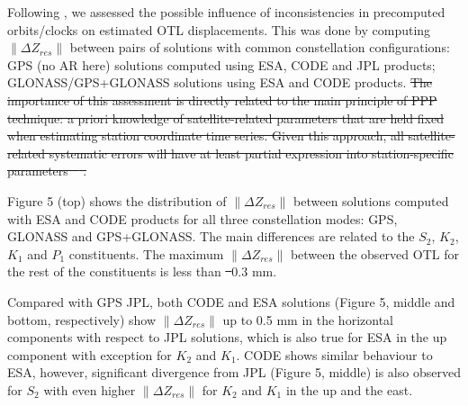 \documentclass[se, manuscript]{copernicus}
\providecommand{\DIFadd}[1]{{\protect\color{blue}\uwave{#1}}} %
\providecommand{\DIFdel}[1]{{\protect\color{red}\sout{#1}}}                      %
\providecommand{\DIFaddbegin}{} %
\providecommand{\DIFaddend}{} %
\providecommand{\DIFdelbegin}{} %
\providecommand{\DIFdelend}{} %
\begin{document}
Following \cite{Yuan2013}, we assessed the possible influence of inconsistencies in precomputed orbits/clocks on estimated OTL displacements. This was done by computing $\|\Delta Z_{res}\|$ between pairs of solutions with common constellation configurations: GPS (no AR here) solutions computed using ESA, CODE and JPL products; GLONASS/GPS+GLONASS solutions using ESA and CODE products.
\DIFdelbegin \DIFdel{The importance of this assessment is directly related to the main principle of PPP technique: a priori knowledge of satellite-related parameters that are held fixed when estimating station coordinate time series. Given this approach, all satellite-related systematic errors will have at least partial expression into station-specific parameters \mbox{%
\citep{Yuan2013}}\hspace{0pt}%
.
}\DIFdelend 

Figure 5 (top) shows the distribution of $\|\Delta Z_{res}\|$ between solutions computed with ESA and CODE products for all three constellation modes: GPS, GLONASS and GPS+GLONASS. The main differences are related to the $S_2$, $K_2$, $K_1$ and $P_1$ constituents. The maximum $\|\Delta Z_{res}\|$ between the observed OTL for the rest of the constituents is less than \DIFdelbegin \DIFdel{~}\DIFdelend \DIFaddbegin \DIFadd{$\sim$}\DIFaddend 0.3 mm.

Compared with GPS JPL, both CODE and ESA solutions (Figure 5, middle and bottom, respectively) show $\|\Delta Z_{res}\|$ up to 0.5 mm in the horizontal components with respect to JPL solutions, which is also true for ESA in the up component with exception for $K_2$ and $K_1$. CODE shows similar behaviour to ESA, however, significant divergence from JPL (Figure 5, middle) is also observed for $S_2$ with even higher $\|\Delta Z_{res}\|$ for $K_2$ and $K_1$ in the up and the east.
\end{document}
